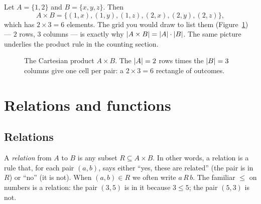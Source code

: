 \begin{example}
\label{ch38:ex-product}
Let $A = \{1, 2\}$ and $B = \{x, y, z\}$. Then
\[
A \times B = \{(1,x),(1,y),(1,z),(2,x),(2,y),(2,z)\},
\]
which has $2 \times 3 = 6$ elements. The grid you would draw to list them (Figure~\ref{fig:cartesian-product}) --- $2$
rows, $3$ columns --- is exactly why $\lvert A \times B\rvert = \lvert A\rvert\cdot\lvert B\rvert$. The
same picture underlies the product rule in the counting section.

\begin{figure}[htbp]
\centering
{}
\caption{The Cartesian product $A \times B$. The $\lvert A\rvert = 2$ rows times the $\lvert B\rvert = 3$ columns give one cell per pair: a $2 \times 3 = 6$ rectangle of outcomes.}
\label{fig:cartesian-product}
\end{figure}
\end{example}

\section{Relations and functions}
\label{ch38:relations}

\subsection{Relations}

A \emph{relation} from $A$ to $B$ is any subset $R \subseteq A \times B$. In
other words, a relation is a rule that, for each pair $(a,b)$, says either
``yes, these are related'' (the pair is in $R$) or ``no'' (it is not). When
$(a,b) \in R$ we often write $a\, R\, b$. The familiar $\le$ on numbers is a
relation: the pair $(3, 5)$ is in it because $3 \le 5$; the pair $(5, 3)$ is not.

